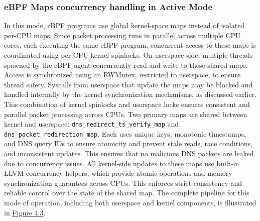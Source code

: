 \documentclass [11pt, proquest] {uwthesis}[2020/02/24]
\begin{document}
\subsubsection{\textbf{eBPF Maps concurrency handling in Active Mode}}
\label{active:sec3}
In this mode, eBPF programs use global kernel-space maps instead of isolated per-CPU maps. Since packet processing runs in parallel across multiple CPU cores, each executing the same eBPF program, concurrent access to these maps is coordinated using per-CPU kernel spinlocks. On userspace side, multiple threads spawned by the eBPF agent concurrently read and write to these shared maps. Access is synchronized using an RWMutex, restricted to userspace, to ensure thread safety. Syscalls from userspace that update the maps may be blocked and handled internally by the kernel synchronization mechanisms, as discussed earlier. This combination of kernel spinlocks and userspace locks ensures consistent and parallel packet processing across CPUs. Two primary maps are shared between kernel and userspace: \texttt{dns\_redirect\_ts\_verify\_map} and \texttt{dns\_packet\_redirection\_map}. Each uses unique keys, monotonic timestamps, and DNS query IDs to ensure atomicity and prevent stale reads, race conditions, and inconsistent updates. This ensures that no malicious DNS packets are leaked due to concurrency issues. All kernel-side updates to these maps use built-in LLVM concurrency helpers, which provide atomic operations and memory synchronization guarantees across CPUs. This enforces strict consistency and reliable control over the state of the shared map. The complete pipeline for this mode of operation, including both userspace and kernel components, is illustrated in \hyperref[sec:dp-active-phase]{Figure 4.3}.




\end{document}
